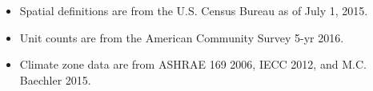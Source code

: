 \begin{itemize}
\item Spatial definitions are from the U.S. Census Bureau as of July 1, 2015.
\item Unit counts are from the American Community Survey 5-yr 2016.
\item Climate zone data are from ASHRAE 169 2006, IECC 2012, and M.C. Baechler 2015.
\end{itemize}
